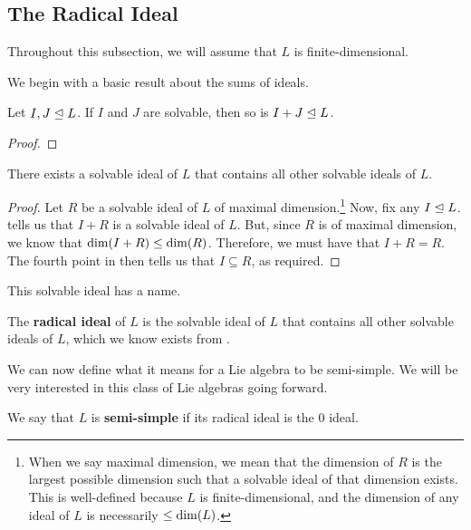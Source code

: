 \subsection{The Radical Ideal}

Throughout this subsection, we will assume that $L$ is finite-dimensional.

We begin with a basic result about the sums of ideals.

\begin{boxlemma}\label{Ch1:Lemma:SumIdealSolvable}
    Let $I, J \trianglelefteq L$. If $I$ and $J$ are solvable, then so is $I + J \trianglelefteq L$.
\end{boxlemma}
\begin{proof}
    \sorry
\end{proof}

\begin{boxcorollary}\label{Ch1:Cor:RadExists}
    There exists a solvable ideal of $L$ that contains all other solvable ideals of $L$.
\end{boxcorollary}
\begin{proof}
    Let $R$ be a solvable ideal of $L$ of maximal dimension.\footnote{When we say maximal dimension, we mean that the dimension of $R$ is the largest possible dimension such that a solvable ideal of that dimension exists. This is well-defined because $L$ is finite-dimensional, and the dimension of any ideal of $L$ is necessarily $\leq \dim\!\left( L \right)$.} Now, fix any $I \trianglelefteq L$.  tells us that $I + R$ is a solvable ideal of $L$. But, since $R$ is of maximal dimension, we know that $\dim\!\left( I + R \right) \leq \dim\!\left( R \right)$. Therefore, we must have that $I + R = R$. The fourth point in  then tells us that $I \subseteq R$, as required.
\end{proof}

This solvable ideal has a name.

\begin{boxdefinition}
    The \textbf{radical ideal} of $L$ is the solvable ideal of $L$ that contains all other solvable ideals of $L$, which we know exists from .
\end{boxdefinition}

We can now define what it means for a Lie algebra to be semi-simple. We will be very interested in this class of Lie algebras going forward.

\begin{boxdefinition}\label{Ch1:Def:SemiSimple}
    We say that $L$ is \textbf{semi-simple} if its radical ideal is the $0$ ideal.
\end{boxdefinition}


